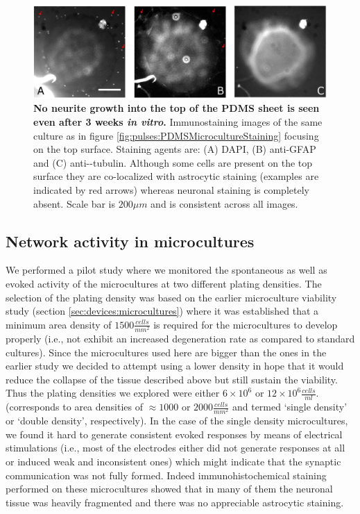    \begin{figure}[!htb]
       \centering
       \includegraphics[width=15cm]{chapter6/figures/topOfSheetSTaining/topOfSheetStaining.jpg}
        \caption[Effectiveness of surface-then-bond in maintaining an isolated microculture - immunostaining evidence]{\textbf{No neurite growth into the top of the PDMS sheet is seen even after 3 weeks \textit{in vitro}.} Immunostaining images of the same culture as in figure \ref{fig:pulses:PDMSMicrocultureStaining} focusing on the top surface. Staining agents are: (A) DAPI, (B) anti-GFAP and (C) anti-\textbeta-tubulin. Although some cells are present on the top surface they are co-localized with astrocytic staining (examples are indicated by red arrows) whereas neuronal staining is completely absent. Scale bar is \(200 \mu m\) and is consistent across all images.}
       \label{fig:pulses:topOfSheetTaining}
   \end{figure}

   \subsection{Network activity in microcultures}
   We performed a pilot study where we monitored the spontaneous as well as evoked activity of the microcultures at two different plating densities. The selection of the plating density was based on the earlier microculture viability study (section \ref{sec:devices:microcultures}) where it was established that a minimum area density of \(1500\frac{cells}{mm^{2}}\) is required for the microcultures to develop properly (i.e., not exhibit an increased degeneration rate as compared to standard cultures). Since the microcultures used here are bigger than the ones in the earlier study we decided to attempt using a lower density in hope that it would reduce the collapse of the tissue described above but still sustain the viability. Thus the plating densities we explored were either \(6\times 10^{6}\) or \(12\times 10^{6}\frac{cells}{ml}\). (corresponds to area densities of \(\approx 1000\) or \(2000\frac{cells}{mm^{2}}\) and termed `single density' or `double density', respectively). In the case of the single density microcultures, we found it hard to generate consistent evoked responses by means of electrical stimulations (i.e., most of the electrodes either did not generate responses at all or induced weak and inconsistent ones) which might indicate that the synaptic communication was not fully formed. Indeed immunohistochemical staining performed on these microcultures showed that in many of them the neuronal tissue was heavily fragmented and there was no appreciable astrocytic staining.


